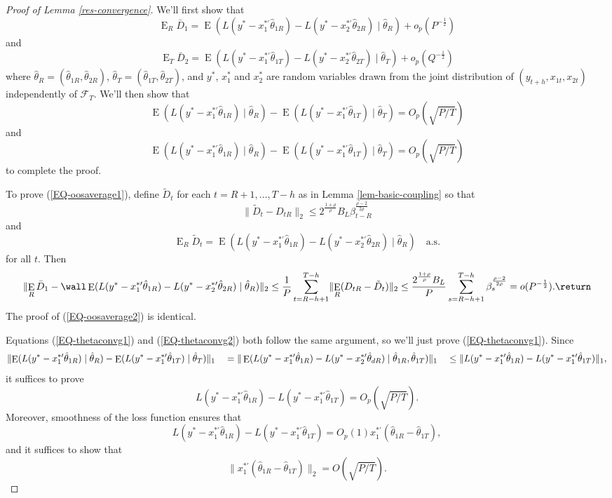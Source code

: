 \documentclass[11pt]{article}
\DeclareMathOperator{\E}{E}
\newcommand{\oosSum}[2]{\ensuremath{\sum_{#1=R-\h+#2}^{T-\h}}}
\newcommand{\h}{h}
\newcommand{\couplingConstant}{\ensuremath{2^{\frac{1+\rho}{\rho}} B_L}}
\newcommand{\couplingBeta}[1]{\ensuremath{\beta^{\frac{\rho-2}{2\rho}}_{#1}}}
\newcommand{\couplingBound}[1]{\couplingConstant \couplingBeta{#1}}
\newcommand{\bh}[1]{\ensuremath{\hat\theta_{#1}}}
\begin{document}
\begin{proof}[Proof of Lemma \ref{res-convergence}]
\newcommand{\resConvgRHS}[1]{\ensuremath{\E(L(y^* - x_1^{*\prime}\bh{1#1}) - L(y^{*} -
x_2^{*\prime}\bh{2#1}) \mid \bh{#1})}}
\newcommand{\resConvgEstDiff}[1]{\ensuremath{\E(L(y^{*} -
    x_{#1}^{*\prime}\bh{#1R}) \mid \bh{R}) - 
\E(L(y^{*} - x_{#1}^{*\prime}\bh{#1T}) \mid \bh{T})}}
\newcommand{\resConvgEstDiffRV}[1]{\ensuremath{L(y^{*} -
    x_{#1}^{*\prime}\bh{#1R}) - L(y^{*} - x_{#1}^{*\prime}\bh{#1T})}}
We'll first show that 
\begin{equation}\label{EQ-oosaverage1}
\E_R \bar D_1 = \resConvgRHS{R} + o_p(P^{-\frac12})
\end{equation}
and
\begin{equation}\label{EQ-oosaverage2}
\E_T \bar D_2 = \resConvgRHS{T} + o_p(Q^{-\frac12})
\end{equation}
where $\hat\theta_R = (\hat\theta_{1R}, \hat\theta_{2R})$,
$\hat\theta_T = (\hat\theta_{1T}, \hat\theta_{2T})$, and $y^{*}$,
$x_1^{*}$ and $x_2^{*}$ are random variables drawn from the joint
distribution of $(y_{t+\h},x_{1t},x_{2t})$ independently of
$\mathcal{F}_T$.  We'll then show that
\begin{equation}\label{EQ-thetaconvg1}
\resConvgEstDiff{1} = O_p(\sqrt{P/T})
\end{equation}
and
\begin{equation}\label{EQ-thetaconvg2}
\resConvgEstDiff{1} = O_p(\sqrt{P/T})
\end{equation}
to complete the proof.

To prove (\ref{EQ-oosaverage1}), define $\tilde D_t$ for each $t = R+1,\dots,T-\h$ as
in Lemma \ref{lem-basic-coupling} so that
\[
\lVert \tilde D_t - D_{tR} \rVert_2 \leq \couplingBound{t-R}
\]
and 
\[
\E_R \tilde D_t = \resConvgRHS{R} \quad\text{a.s.}
\]
for all $t$.  Then 
\[
\lVert \E_R \bar D_1 - \wall \resConvgRHS{R} \rVert_2  \\
\leq \frac1P \oosSum{t}{1} \lVert \E_R (D_{tR} - \tilde D_t) \rVert_2 \\
\leq \frac{\couplingConstant}{P} \oosSum{s}{1} \couplingBeta{s} \\
= o(P^{-\frac12}).
\return
\]
The proof of (\ref{EQ-oosaverage2}) is identical.

Equations (\ref{EQ-thetaconvg1}) and (\ref{EQ-thetaconvg2}) both
follow the same argument, so we'll just prove (\ref{EQ-thetaconvg1}).
Since 
\[ \lVert \resConvgEstDiff{1} \rVert_1 \\ \quad= \| \E(L(y^{*} -
x_1^{*\prime} \hat{\theta}_{1R}) - L(y^{*} - x_2^{*\prime}
\hat{\theta}_{dR}) \mid \hat{\theta}_{1R}, \hat{\theta}_{1T}) \|_1 \\
\quad\leq \lVert \resConvgEstDiffRV{1} \rVert_1, \] it suffices to
prove
\[ \resConvgEstDiffRV{1} = O_p(\sqrt{P/T}). \]
Moreover, smoothness of the loss function ensures that
\[ \resConvgEstDiffRV{1} = O_p(1) x_1^{*\prime} (\bh{1R} -
\bh{1T}), \]
and it suffices to show that
\begin{equation*}
  \lVert x_1^{*\prime}(\bh{1R} - \bh{1T}) \rVert_2 = O(\sqrt{P/T}).
\end{equation*}


\end{proof}
\end{document}
